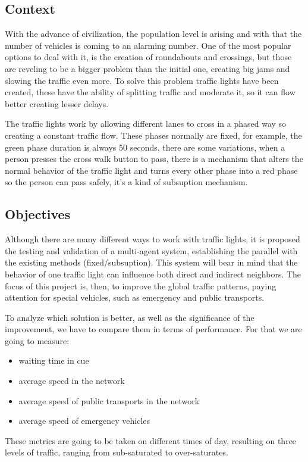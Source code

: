 \documentclass[10pt,a4paper]{article}
\begin{document}
\subsection{Context}

    	With the advance of civilization, the population level is arising and with that the number of vehicles is coming to an alarming number. One of the most popular options to deal with it, is the creation of roundabouts and crossings, but those are reveling to be a bigger problem than the initial one, creating big jams and slowing the traffic even more. To solve this problem traffic lights have been created, these have the ability of splitting traffic and moderate it, so it can flow better creating lesser delays. 

	The traffic lights work by allowing different lanes to cross in a phased way so creating a constant traffic flow. These phases normally are fixed, for example, the green phase duration is always  50 seconds, there are some variations, when a person presses the cross walk button to pass, there is a mechanism that alters the normal behavior of the traffic light and turns every other phase into a red phase so the person can pass safely, it's a kind of subsuption mechanism.


\subsection{Objectives}
	Although there are many different ways to work with traffic lights, it is proposed the testing and validation of a multi-agent system, establishing the parallel with the existing methods (fixed/subsuption). This system will bear in mind that the behavior of one traffic light can influence both direct and indirect neighbors. The focus of this project is, then, to improve the global traffic patterns, paying attention for special vehicles, such as emergency and public transports.
   
	To analyze which solution is better, as well as the significance of the improvement, we have to compare them in terms of performance. For that we are going to measure:
\begin{itemize}
\item waiting time in cue 
\item average speed in the network
\item average speed of public transports in the network
\item average speed of emergency vehicles
\end{itemize}
	These metrics are going to be taken on different times of day, resulting on three levels of traffic, ranging from sub-saturated to over-saturates.
    
\end{document}
